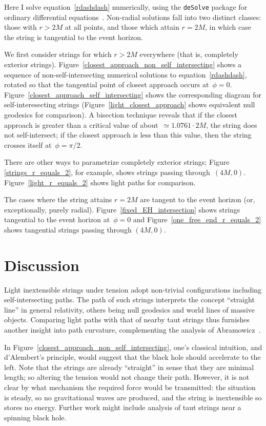 \documentclass[review]{elsarticle}
\begin{document}
Here I solve equation~\ref{rdashdash} numerically, using the
\verb+deSolve+ package for ordinary differential
equations~\cite{soetart2010}.  Non-radial solutions fall into two
distinct classes: those with $r>2M$ at all points, and those which
attain $r=2M$, in which case the string is tangential to the event
horizon.

We first consider strings for which $r>2M$ everywhere (that is,
completely exterior strings).
Figure~\ref{closest_approach_non_self_intersecting} shows a sequence
of non-self-intersecting numerical solutions to
equation~\ref{rdashdash}, rotated so that the tangential point of
closest approach occurs at~$\phi=0$.
Figure~\ref{closest_approach_self_intersecting} shows the
corresponding diagram for self-interesecting strings
(Figure~\ref{light_closest_approach} shows equivalent null geodesics
for comparison).  A bisection technique reveals that if the closest
approach is greater than a critical value of about~$\simeq 1.0761\cdot
2M$, the string does not self-intersect; if the closest approach is
less than this value, then the string crosses itself at~$\phi=\pi/2$.

There are other ways to parametrize completely exterior strings;
Figure \ref{strings_r_equals_2}, for example, shows strings passing
through~$(4M,0)$.  Figure~\ref{light_r_equals_2} shows light paths for
comparison.

The cases where the string attains $r=2M$ are tangent to the event
horizon (or, exceptionally, purely radial).
Figure~\ref{fixed_EH_intersection} shows strings tangential to the
event horizon at~$\phi=0$ and Figure~\ref{one_free_end_r_equals_2}
shows tangential strings passing through $(4M,0)$.

\section{Discussion}

Light inextensible strings under tension adopt non-trivial
configurations including self-intersecting paths.  The path of such
strings interprets the concept ``straight line'' in general
relativity, others being null geodesics and world lines of massive
objects.  Comparing light paths with that of nearby taut strings thus
furnishes another insight into path curvature, complementing the
analysis of Abramowicz~\cite{abramowicz1992}.

In Figure~\ref{closest_approach_non_self_intersecting}, one's
classical intuition, and d'Alembert's principle, would suggest that
the black hole should accelerate to the left.  Note that the strings
are already ``straight'' in sense that they are minimal length; so
altering the tension would not change their path.  However, it is not
clear by what mechanism the required force would be transmitted: the
situation is steady, so no gravitational waves are produced, and the
string is inextensible so stores no energy.  Further work might
include analysis of taut strings near a spinning black hole.
\end{document}
